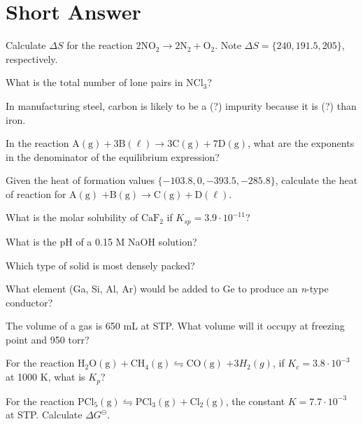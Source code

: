 \documentclass[answers]{exam}
\begin{document}

\vspace{1mm}
\section{Short Answer}
\begin{multicols}{2}
\begin{questions}

\question Calculate $\Delta S$ for the reaction $\mathrm{2NO_2 \to 2N_2 + O_2}$. Note $\Delta S = \{ 240, 191.5, 205 \}$, respectively.
\answerline[108]

\question What is the total number of lone pairs in $\mathrm{NCl_3}$?
\answerline[10]

\question In manufacturing steel, carbon is likely to be a (?) impurity because it is (?) than iron.

\question In the reaction $\mathrm{A(g) + 3 B(\ell) \to 3 C(g) + 7 D(g)}$, what are the exponents in the denominator of the equilibrium expression?
\answerline[1; 0]

\question Given the heat of formation values $\{-103.8, 0, -393.5, -285.8 \}$, calculate the heat of reaction for $\mathrm{A(g)}$ $\mathrm{ + B(g) \to C(g) + D(\ell)}$.

\question What is the molar solubility of $\mathrm{CaF_2}$ if $K_{sp} = 3.9 \cdot 10^{-11}$?

\question What is the pH of a 0.15 M NaOH solution?
\answerline[13.18]

\question Which type of solid is most densely packed?
\answerline[fcc]

\question What element (Ga, Si, Al, Ar) would be added to Ge to produce an \textit{n}-type conductor?
\answerline[Ar]

\question The volume of a gas is 650 mL at STP. What volume will it occupy at freezing point and 950 torr?
\answerline[520]

\question For the reaction $\mathrm{H_2O(g) + CH_4(g) \leftrightharpoons CO(g)}$ $+ 3H_2(g)$, if $K_c = 3.8 \cdot 10^{-3}$ at 1000 K, what is $K_p$?
\answerline[26]

\question For the reaction $\mathrm{PCl_5(g) \leftrightharpoons PCl_3(g) + Cl_2(g)}$, the constant $K = 7.7 \cdot 10^{-3}$ at STP. Calculate $\Delta G^\ominus$.
\answerline[12,000 J/mol]

\end{questions}
\end{multicols}
\end{document}
